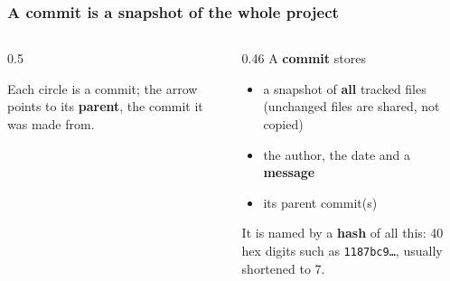 \documentclass[aspectratio=169,10pt,compress]{beamer}
\begin{document}




\begin{frame}[t,fragile] \frametitle{A commit is a snapshot of the whole project}
  \begin{columns}[T]
    \begin{column}{0.5\textwidth}
      \begin{center}
      \end{center}
      \small Each circle is a commit; the arrow points to its \textbf{parent}, the commit it was made from.
    \end{column}
    \begin{column}{0.46\textwidth}
      A \textbf{commit} stores
      \begin{itemize}\small
        \item a snapshot of \textbf{all} tracked files (unchanged files are shared, not copied)
        \item the author, the date and a \textbf{message}
        \item its parent commit(s)
      \end{itemize}
      It is named by a \textbf{hash} of all this: 40 hex digits such as \texttt{1187bc9\dots}, usually shortened to 7.
    \end{column}
  \end{columns}
\end{frame}
\end{document}
